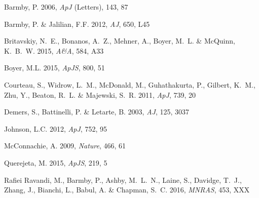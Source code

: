 \documentclass{iau}
\begin{document}
\begin{thebibliography}{}

{{Barmby,} P. \etal} 2006, \textit{ApJ} (Letters), 143, 87

{{Barmby,} P. \& {Jalilian}, F.F.} 2012, \textit{AJ}, 650, L45

{{Britavskiy}, N.~E., {Bonanos}, A.~Z., {Mehner}, A., {Boyer}, M.~L.  \& {McQuinn}, K.~B.~W.}
2015, \textit{A\&A}, 584, A33

{{Boyer}, M.L. \etal} 2015, \textit{ApJS}, 800, 51

{{Courteau}, S., {Widrow}, L.~M., {McDonald}, M., {Guhathakurta}, P., 
	{Gilbert}, K.~M., {Zhu}, Y., {Beaton}, R.~L. \& {Majewski}, S.~R.}
2011, \textit{ApJ}, 739, 20

{{Demers}, S., {Battinelli}, P. \& {Letarte}, B.} 2003, \textit{AJ}, 125, 3037

{Johnson, L.C. \etal} 2012, \textit{ApJ}, 752, 95

{{McConnachie}, A. \etal} 2009, \textit{Nature}, 466, 61

{{Querejeta}, M. \etal} 2015, \textit{ApJS}, 219, 5

{{Rafiei Ravandi}, M., {Barmby}, P., {Ashby}, M.~L.~N., 
	{Laine}, S., {Davidge}, T.~J., {Zhang}, J., {Bianchi}, L., 
	{Babul}, A. \& {Chapman}, S.~C.}  2016, \textit{MNRAS}, 453, XXX


\end{thebibliography}
\end{document}
